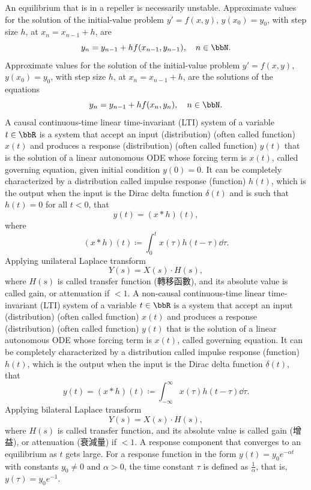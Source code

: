\documentclass[a4paper,12pt]{report}
\begin{document}
An equilibrium that is in a repeller is necessarily unstable.
Approximate values for the solution of the initial-value problem $y'=f(x,y)$, $y(x_0)=y_0$, with step size $h$, at $x_n=x_{n-1}+h$, are
\[y_n=y_{n-1}+hf(x_{n-1},y_{n-1}),\quad n\in\bbN.\]
Approximate values for the solution of the initial-value problem $y'=f(x,y)$, $y(x_0)=y_0$, with step size $h$, at $x_n=x_{n-1}+h$, are the solutions of the equations
\[y_n=y_{n-1}+hf(x_n,y_n),\quad n\in\bbN.\]
A causal continuous-time linear time-invariant (LTI) system of a variable $t\in\bbR$ is a system that accept an input (distribution) (often called function) $x(t)$ and produces a response (distribution) (often called function) $y(t)$ that is the solution of a linear autonomous ODE whose forcing term is $x(t)$, called governing equation, given initial condition $y(0)=0$. It can be completely characterized by a distribution called impulse response (function) $h(t)$, which is the output when the input is the Dirac delta function $\delta(t)$ and is such that $h(t)=0$ for all $t<0$, that
\[y(t)=(x*h)(t),\]
where
\[(x*h)(t)\coloneq\int_0^tx(\tau)h(t-\tau)\dd{\tau}.\]
Applying unilateral Laplace transform \[Y(s)=X(s)\cdot H(s),\]
where $H(s)$ is called transfer function (轉移函數), and its absolute value is called gain, or attenuation if $<1$.
A non-causal continuous-time linear time-invariant (LTI) system of a variable $t\in\bbR$ is a system that accept an input (distribution) (often called function) $x(t)$ and produces a response (distribution) (often called function) $y(t)$ that is the solution of a linear autonomous ODE whose forcing term is $x(t)$, called governing equation. It can be completely characterized by a distribution called impulse response (function) $h(t)$, which is the output when the input is the Dirac delta function $\delta(t)$, that
\[y(t)=(x*h)(t)\coloneq\int_{-\infty}^{\infty} x(\tau)h(t-\tau)\dd{\tau}.\]
Applying bilateral Laplace transform \[Y(s)=X(s)\cdot H(s),\]
where $H(s)$ is called transfer function, and its absolute value is called gain (增益), or attenuation (衰減量) if $<1$.
A response component that converges to an equilibrium as $t$ gets large.
For a response function in the form $y(t)=y_0e^{-\alpha t}$ with constants $y_0\neq 0$ and $\alpha>0$, the time constant $\tau$ is defined as $\frac{1}{\alpha}$, that is, $y(\tau)=y_0e^{-1}$.
\end{document}
